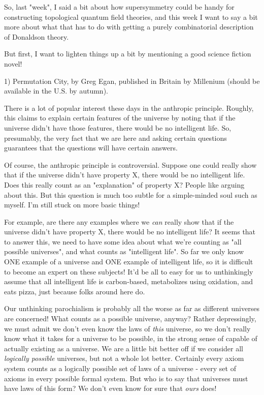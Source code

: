 

So, last "week", I said a bit about how supersymmetry could be
handy for constructing topological quantum field theories, and
this week I want to say a bit more about what that has to do
with getting a purely combinatorial description of Donaldson theory.

But first, I want to lighten things up a bit by mentioning
a good science fiction novel!

1) Permutation City, by Greg Egan, published in Britain
by Millenium (should be available in the U.S. by autumn).

There is a lot of popular interest these days in
the anthropic principle.  Roughly, this claims to explain 
certain features of the universe by noting that if the universe
didn't have those features, there would be no intelligent
life.  So, presumably, the very fact that we are here and
asking certain questions guarantees that the questions will
have certain answers.  

Of course, the anthropic principle is controversial.  Suppose
one could really show that if the universe didn't have property
X, there would be no intelligent life.  Does this really count
as an "explanation" of property X?  People like arguing about
this.  But this question is much too subtle for a simple-minded 
soul such as myself.  I'm still stuck on more basic things!

For example, are there any examples where we \emph{can} really show
that if the universe didn't have property X, there would be
no intelligent life?  It seems that to answer this, we need
to have some idea about what we're counting as "all possible
universes", and what counts as "intelligent life".  So
far we only know ONE example of a universe and ONE example of
intelligent life, so it is difficult to become an expert on these
subjects!  It'd be all to easy for us to unthinkingly assume that
all intelligent life is carbon-based, metabolizes using
oxidation, and eats pizza, just because folks around here do.  

Our unthinking parochialism is probably all the worse as far as 
different universes are concerned!  What counts as a possible universe, 
anyway?  Rather depressingly, we must admit we don't even know
the laws of \emph{this} universe, so we don't really know what it takes
for a universe to be possible, in the strong sense of capable of
actually existing as a universe.  We are a little bit better off
if we consider all \emph{logically possible} universes, but not a whole
lot better.  Certainly every axiom system counts as a logically
possible set of laws of a universe - every set of axioms in every
possible formal system.  But who is to say that universes must have
laws of this form?  We don't even know for sure that \emph{ours} does!

